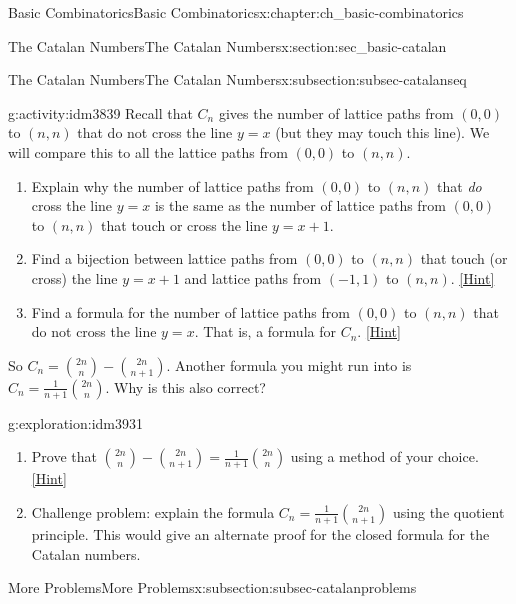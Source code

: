 \documentclass[oneside,10pt,]{book}
\numberwithin{equation}{chapter}
\begin{document}
\begin{chapterptx}{Basic Combinatorics}{}{Basic Combinatorics}{}{}{x:chapter:ch_basic-combinatorics}
\begin{sectionptx}{The Catalan Numbers}{}{The Catalan Numbers}{}{}{x:section:sec_basic-catalan}
\begin{subsectionptx}{The Catalan Numbers}{}{The Catalan Numbers}{}{}{x:subsection:subsec-catalanseq}
\begin{activity}{}{g:activity:idm3839}%
Recall that \(C_n\) gives the number of lattice paths from \((0,0)\) to \((n,n)\) that do not cross the line \(y = x\) (but they may touch this line).  We will compare this to all the lattice paths from \((0,0)\) to \((n,n)\).%
\begin{enumerate}[font=\bfseries,label=(\alph*),ref=\alph*]
\item{}Explain why the number of lattice paths from \((0,0)\) to \((n,n)\) that \emph{do} cross the line \(y = x\) is the same as the number of lattice paths from \((0,0)\) to \((n,n)\) that touch or cross the line \(y = x + 1\).%
\item{}Find a bijection between lattice paths from \((0,0)\) to \((n,n)\) that touch (or cross) the line \(y=x+1\) and lattice paths from \((-1,1)\) to \((n,n)\).%
\space\hspace*{0pt}\hfill{\tiny\hyperlink{g:hint:idm3877-back}{[Hint]}}\item{}Find a formula for the number of lattice paths from \((0,0)\) to \((n,n)\) that do not cross the line \(y=x\). That is, a formula for \(C_n\).%
\space\hspace*{0pt}\hfill{\tiny\hyperlink{g:hint:idm3922-back}{[Hint]}}\end{enumerate}
\end{activity}
So \(C_n = \binom{2n}{n} - \binom{2n}{n+1}\).  Another formula you might run into is \(C_n = \frac{1}{n+1}\binom{2n}{n}\).  Why is this also correct?%
\begin{exploration}{}{g:exploration:idm3931}%
\begin{enumerate}[font=\bfseries,label=(\alph*),ref=\alph*]
\item{}Prove that \(\binom{2n}{n} - \binom{2n}{n+1} = \frac{1}{n+1}\binom{2n}{n}\) using a method of your choice.%
\space\hspace*{0pt}\hfill{\tiny\hyperlink{g:hint:idm3936-back}{[Hint]}}\item{}Challenge problem: explain the formula \(C_n = \frac{1}{n+1}\binom{2n}{n+1}\) using the quotient principle.  This would give an alternate proof for the closed formula for the Catalan numbers.%
\end{enumerate}
\end{exploration}
\end{subsectionptx}
%
%
\typeout{************************************************}
\typeout{************************************************}
%
\begin{subsectionptx}{More Problems}{}{More Problems}{}{}{x:subsection:subsec-catalanproblems}

\end{subsectionptx}
\end{sectionptx}
\end{chapterptx}
\end{document}
